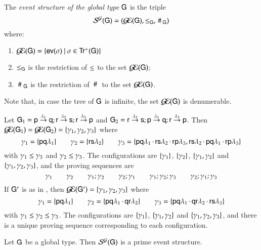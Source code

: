 \begin{definition} The {\em
    event structure of  the global type
    } 
    ${{\sf G}}$ is the triple
\[
 \mathcal{S}^{\mathcal{G}}({{\sf G}}) = (\mathcal{G\!E}({{\sf G}}), \leq_{{\sf G}} , \,\#\,_{{\sf G}})
 \]
 where:
\begin{enumerate}
\item{} 
 $\mathcal{G\!E}({{\sf G}}) =
\{ {\sf ev}(\sigma)\ |\ \sigma\in{\sf Tr^+}({\sf G})\}$  
\item{} $\leq_{{\sf G}}$ is the restriction of $\leq$ to the set $\mathcal{G\!E}({{\sf G}})$;
\item{} $~\#~_{{\sf G}}$ is the restriction of $~\#~$ to the set $\mathcal{G\!E}({{\sf G}})$.
\end{enumerate}
\end{definition}
 Note that, %
 in case the tree of ${\sf G}$ is infinite, the set $\mathcal{G\!E}({\sf G})$  is  
 denumerable.  
\begin{example}
  Let
  ${\sf G}_1={\sf p}\stackrel{\lambda_1}{\to}{\sf q};{\sf r}\stackrel{\lambda_2}{\to}{\sf s};{\sf r}\stackrel{\lambda_3}{\to}{\sf p}$
  and
  ${\sf G}_2={\sf r}\stackrel{\lambda_2}{\to}{\sf s};{\sf p}\stackrel{\lambda_1}{\to}{\sf q};{\sf r}\stackrel{\lambda_3}{\to}{\sf p}$.
  Then $\mathcal{G\!E}({\sf G}_1)=\mathcal{G\!E}({\sf G}_2)=\{\gamma_1,\gamma_2,\gamma_3\}$
  where
  \[
  \gamma_1=\{{\sf p}{\sf q}\lambda_1\}\qquad
    \gamma_2=\{{\sf r}{\sf s}\lambda_2\}\qquad
    \gamma_3=\{{\sf p}{\sf q}\lambda_1\,{\cdot}\,{\sf r}{\sf s}\lambda_2\,{\cdot}\,{\sf r}{\sf p}\lambda_3,
    {\sf r}{\sf s}\lambda_2\,{\cdot}\,{\sf p}{\sf q}\lambda_1\,{\cdot}\,{\sf r}{\sf p}\lambda_3
    \}
    \]
    with $\gamma_1\leq\gamma_3$ and
  $\gamma_2\leq\gamma_3$. The configurations are
  $\{\gamma_1\}$, $\{\gamma_2\}$,   $\{\gamma_1,\gamma_2\}$    and
  $\{\gamma_1,\gamma_2,\gamma_3\}$, and the proving sequences
  are
 \[
  \gamma_1\qquad \gamma_2\qquad
    \gamma_1;\gamma_2\qquad
    \gamma_2;\gamma_1\qquad
    \gamma_1;\gamma_2;\gamma_3\qquad
    \gamma_2;\gamma_1;\gamma_3
    \]
  If ${\sf G}'$ is as in , then
  $\mathcal{G\!E}({\sf G}')=\{\gamma_1,\gamma_2,\gamma_3\}$ where
\[
  \gamma_1=\{{\sf p}{\sf q}\lambda_1\}\qquad
    \gamma_2=\{{\sf p}{\sf q}\lambda_1\,{\cdot}\,{\sf q}{\sf r}\lambda_2\}\qquad
    \gamma_3=\{{\sf p}{\sf q}\lambda_1\,{\cdot}\,{\sf q}{\sf r}\lambda_2\,{\cdot}\,{\sf r}  {\sf s} \lambda_3\}
    \]
with
  $\gamma_1\leq\gamma_2\leq\gamma_3$. The configurations are
  $\{\gamma_1\}$, $\{\gamma_1,\gamma_2\}$ and
  $\{\gamma_1,\gamma_2,\gamma_3\}$,  and there is a unique
   proving sequence
  corresponding to each configuration. \end{example}
%
\begin{theorem}
Let ${{\sf G}}$ be a  global type. 
Then  $\mathcal{S}^{\mathcal{G}}({{\sf G}})$  is a prime event structure.
\end{theorem}


